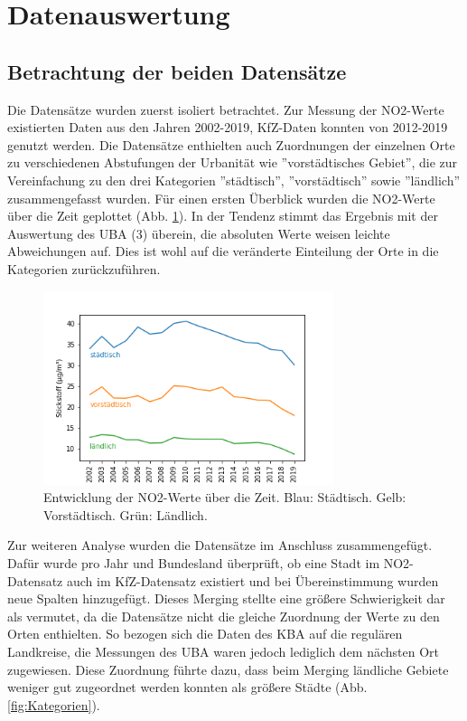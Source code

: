 \documentclass[11pt,a4paper,oneside,german]{article}
\begin{document}
	\section{Datenauswertung}
	
	\subsection{Betrachtung der beiden Datensätze}
	
	Die Datensätze wurden zuerst isoliert betrachtet. Zur Messung der NO2-Werte existierten Daten aus den Jahren 2002-2019, KfZ-Daten konnten von 2012-2019 genutzt werden. Die  Datensätze enthielten auch Zuordnungen der einzelnen Orte zu verschiedenen Abstufungen der Urbanität wie ''vorstädtisches Gebiet'', die zur Vereinfachung zu den drei Kategorien ''städtisch'', ''vorstädtisch'' sowie ''ländlich'' zusammengefasst wurden. Für einen ersten Überblick wurden die NO2-Werte über die Zeit geplottet (Abb. \ref{fig:NO2Entwicklung}). In der Tendenz stimmt das Ergebnis mit der Auswertung des UBA (3) überein, die absoluten Werte weisen leichte Abweichungen auf. Dies ist wohl auf die veränderte Einteilung der Orte in die Kategorien zurückzuführen.\\
	
	\begin{figure}[h!]
		\centering
		\includegraphics[width=8.5cm]{Stickstoff_jahre.png}
		\caption{Entwicklung der NO2-Werte über die Zeit. Blau: Städtisch. Gelb: Vorstädtisch. Grün: Ländlich.}
		\label{fig:NO2Entwicklung}
	\end{figure}
	
	Zur weiteren Analyse wurden die Datensätze im Anschluss zusammengefügt. Dafür wurde pro Jahr und Bundesland überprüft, ob eine Stadt im NO2-Datensatz auch im KfZ-Datensatz existiert und bei Übereinstimmung wurden neue Spalten hinzugefügt. Dieses Merging stellte eine größere Schwierigkeit dar als vermutet, da die Datensätze nicht die gleiche Zuordnung der Werte zu den Orten enthielten. So bezogen sich die Daten des KBA auf die regulären Landkreise, die Messungen des UBA waren jedoch lediglich dem nächsten Ort zugewiesen. Diese Zuordnung führte dazu, dass beim Merging ländliche Gebiete weniger gut zugeordnet werden konnten als größere Städte (Abb. \ref{fig:Kategorien}).\\
	
\end{document}
